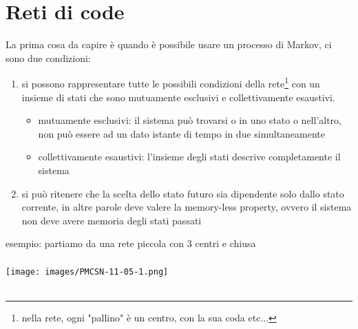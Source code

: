 \documentclass{article}
\begin{document}
\section{Reti di code}
La prima cosa da capire è quando è possibile usare un processo di Markov, ci sono due condizioni:
\begin{enumerate}
\item si possono rappresentare tutte le possibili condizioni della rete\footnote{nella rete, ogni "pallino" è un centro, con la sua coda etc...} con un insieme di stati che sono mutuamente esclusivi e collettivamente esaustivi. 
\begin{itemize}
\item mutuamente esclusivi: il sistema può trovarsi o in uno stato o nell'altro, non può essere ad un dato istante di tempo in due simultaneamente
\item collettivamente esaustivi: l'insieme degli stati descrive completamente il sistema
\end{itemize}
\item si può ritenere che la scelta dello stato futuro sia dipendente solo dallo stato corrente, in altre parole deve valere la memory-less property, ovvero il sistema non deve avere memoria degli stati passati
\end{enumerate}
esempio: partiamo da una rete piccola con 3 centri e chiusa\\\\
\texttt{[image: images/PMCSN-11-05-1.png]}\\\\
\end{document}
